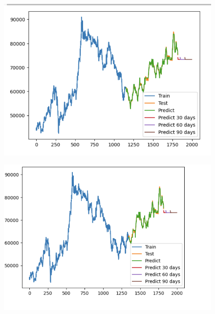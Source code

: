 \documentclass[conference]{IEEEtran}
\begin{document}
\begin{figure}[H]
    \centering
    \begin{minipage}{0.15\textwidth}
    \centering
    \includegraphics[width=1\textwidth]{Image/Light GBM/LightGBM_SS_6_4.png}
   
    \label{fig:1}
    \end{minipage}%
    \begin{minipage}{0.15\textwidth}
    \centering
    \includegraphics[width=1\textwidth]{Image/Light GBM/LightGBM_SS_7_3.png}
  

\end{minipage}
\end{figure}
\end{document}
